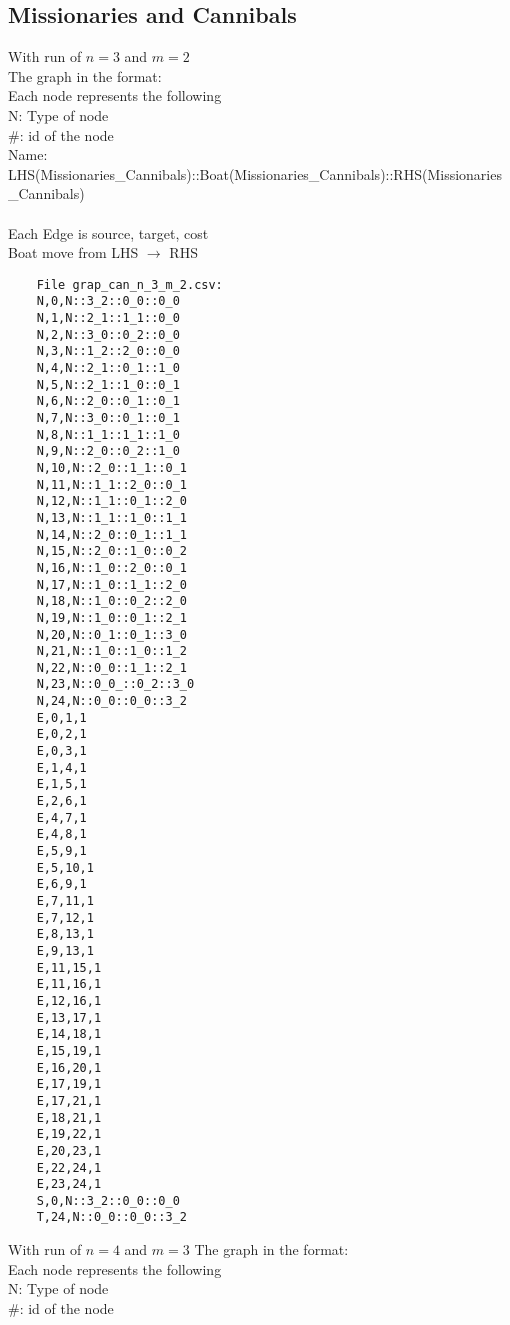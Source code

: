 \documentclass[12pt]{article}
\begin{document}
\subsection{Missionaries and Cannibals}
With run of $n=3$ and $m=2$ \\
The graph in the format:\\
Each node represents the following\\

N: Type of node\\

\#: id of the node\\

Name: LHS(Missionaries\_Cannibals)::Boat(Missionaries\_Cannibals)::RHS(Missionaries\_Cannibals)\\
\\
Each Edge is source, target, cost\\
Boat move from LHS $\to$ RHS
\begin{lstlisting}
	File grap_can_n_3_m_2.csv:
	N,0,N::3_2::0_0::0_0
	N,1,N::2_1::1_1::0_0
	N,2,N::3_0::0_2::0_0
	N,3,N::1_2::2_0::0_0
	N,4,N::2_1::0_1::1_0
	N,5,N::2_1::1_0::0_1
	N,6,N::2_0::0_1::0_1
	N,7,N::3_0::0_1::0_1
	N,8,N::1_1::1_1::1_0
	N,9,N::2_0::0_2::1_0
	N,10,N::2_0::1_1::0_1
	N,11,N::1_1::2_0::0_1
	N,12,N::1_1::0_1::2_0
	N,13,N::1_1::1_0::1_1
	N,14,N::2_0::0_1::1_1
	N,15,N::2_0::1_0::0_2
	N,16,N::1_0::2_0::0_1
	N,17,N::1_0::1_1::2_0
	N,18,N::1_0::0_2::2_0
	N,19,N::1_0::0_1::2_1
	N,20,N::0_1::0_1::3_0
	N,21,N::1_0::1_0::1_2
	N,22,N::0_0::1_1::2_1
	N,23,N::0_0_::0_2::3_0
	N,24,N::0_0::0_0::3_2
	E,0,1,1
	E,0,2,1
	E,0,3,1
	E,1,4,1
	E,1,5,1
	E,2,6,1
	E,4,7,1
	E,4,8,1
	E,5,9,1
	E,5,10,1
	E,6,9,1
	E,7,11,1
	E,7,12,1
	E,8,13,1
	E,9,13,1
	E,11,15,1
	E,11,16,1
	E,12,16,1
	E,13,17,1
	E,14,18,1
	E,15,19,1
	E,16,20,1
	E,17,19,1
	E,17,21,1
	E,18,21,1
	E,19,22,1
	E,20,23,1
	E,22,24,1
	E,23,24,1
	S,0,N::3_2::0_0::0_0
	T,24,N::0_0::0_0::3_2
\end{lstlisting}

With run of $n=4$ and $m=3$ 
The graph in the format:\\
Each node represents the following\\

N: Type of node\\

\#: id of the node\\
\end{document}
